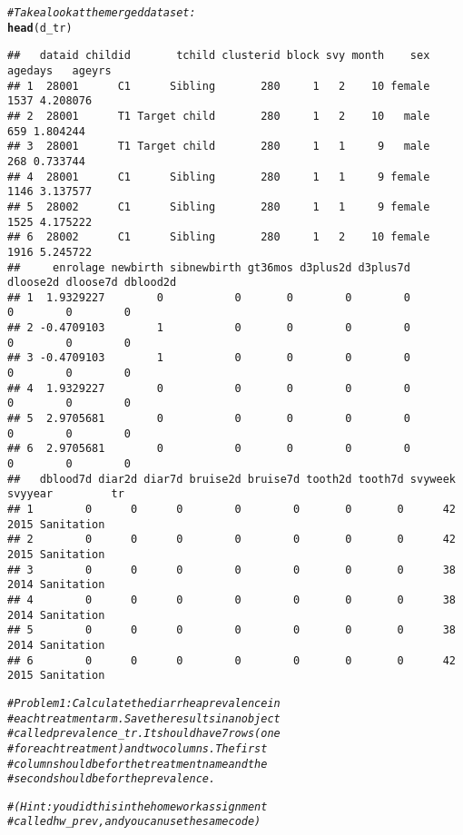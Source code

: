 \documentclass{article}\usepackage[]{graphicx}\usepackage[]{color}
\makeatletter
\newcommand{\hlcom}[1]{\textcolor[rgb]{0.678,0.584,0.686}{\textit{#1}}}%
\newcommand{\hlstd}[1]{\textcolor[rgb]{0.345,0.345,0.345}{#1}}%
\newcommand{\hlkwd}[1]{\textcolor[rgb]{0.737,0.353,0.396}{\textbf{#1}}}%
\newenvironment{kframe}{%
 \def\at@end@of@kframe{}%
 \ifinner\ifhmode%
  \def\at@end@of@kframe{\end{minipage}}%
  \begin{minipage}{\columnwidth}%
 \fi\fi%
 \def\FrameCommand##1{\hskip\@totalleftmargin \hskip-\fboxsep
 \colorbox{shadecolor}{##1}\hskip-\fboxsep
     \hskip-\linewidth \hskip-\@totalleftmargin \hskip\columnwidth}%
 \MakeFramed {\advance\hsize-\width
   \@totalleftmargin\z@ \linewidth\hsize
   \@setminipage}}%
 {\par\unskip\endMakeFramed%
 \at@end@of@kframe}
\newenvironment{knitrout}{}{} %
\makeatother
\begin{document}
\begin{knitrout}
\begin{kframe}
\begin{alltt}
\hlcom{# Take a look at the merged dataset:}
\hlkwd{head}\hlstd{(d_tr)}
\end{alltt}
\begin{verbatim}
##   dataid childid       tchild clusterid block svy month    sex agedays   ageyrs
## 1  28001      C1      Sibling       280     1   2    10 female    1537 4.208076
## 2  28001      T1 Target child       280     1   2    10   male     659 1.804244
## 3  28001      T1 Target child       280     1   1     9   male     268 0.733744
## 4  28001      C1      Sibling       280     1   1     9 female    1146 3.137577
## 5  28002      C1      Sibling       280     1   1     9 female    1525 4.175222
## 6  28002      C1      Sibling       280     1   2    10 female    1916 5.245722
##     enrolage newbirth sibnewbirth gt36mos d3plus2d d3plus7d dloose2d dloose7d dblood2d
## 1  1.9329227        0           0       0        0        0        0        0        0
## 2 -0.4709103        1           0       0        0        0        0        0        0
## 3 -0.4709103        1           0       0        0        0        0        0        0
## 4  1.9329227        0           0       0        0        0        0        0        0
## 5  2.9705681        0           0       0        0        0        0        0        0
## 6  2.9705681        0           0       0        0        0        0        0        0
##   dblood7d diar2d diar7d bruise2d bruise7d tooth2d tooth7d svyweek svyyear         tr
## 1        0      0      0        0        0       0       0      42    2015 Sanitation
## 2        0      0      0        0        0       0       0      42    2015 Sanitation
## 3        0      0      0        0        0       0       0      38    2014 Sanitation
## 4        0      0      0        0        0       0       0      38    2014 Sanitation
## 5        0      0      0        0        0       0       0      38    2014 Sanitation
## 6        0      0      0        0        0       0       0      42    2015 Sanitation
\end{verbatim}
\end{kframe}
\end{knitrout}
\begin{knitrout}
\color{fgcolor}\begin{kframe}
\begin{alltt}
\hlcom{# Problem 1: Calculate the diarrhea prevalence in  }
\hlcom{# each treatment arm. Save the results in an object}
\hlcom{# called prevalence_tr. It should have 7 rows (one}
\hlcom{# for each treatment) and two columns. The first }
\hlcom{# column should be for the treatment name and the}
\hlcom{# second should be for the prevalence. }

\hlcom{# (Hint: you did this in the homework assignment }
\hlcom{# called hw_prev, and you can use the same code)}
\end{alltt}
\end{kframe}
\end{knitrout}
\end{document}
